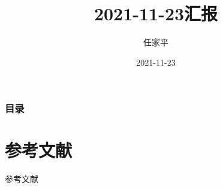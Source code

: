\documentclass[12pt, utf-8]{beamer}
\title{2021-11-23汇报}
\author{任家平}
\institute{同济大学测绘与地理信息学院}
\date{2021-11-23}
\begin{document}
\begin{frame}
    \titlepage
\end{frame}

\begin{frame}
    \frametitle{目录}
    \tableofcontents
\end{frame}






\section{参考文献}
\begin{frame}[allowframebreaks]{参考文献}
    
    \nocite{*}
\end{frame}

% 
\end{document}
